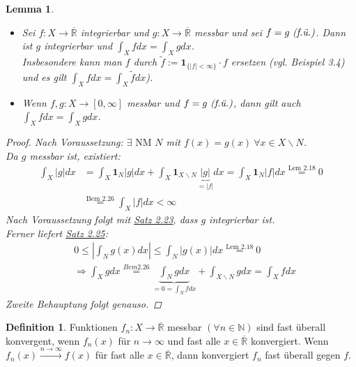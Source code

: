 \documentclass[a4paper]{report}
\newcommand{\doubleOne}{\textbf{1}}
\newcommand{\R}{\mathbb{R}}
\newcommand{\Rq}{\overline{\R}}
\newcommand{\N}{\mathbb{N}}
\newcommand{\jlabel}[1]{\label{j_#1}}
\newcommand{\jshortlink}[1]{\jhyperref{#1}{\text{#1}}}
\newcommand{\jhyperref}[2]{\hyperref[j_#1]{#2}}
\newcommand{\jlink}[1]{\jhyperref{#1}{#1}}
\newcommand{\fu}{\text{\textit{(f.ü.)}}}
\newcommand{\jabb}[3]{ #1: #2 \rightarrow #3 }
\theoremstyle{plain}
\newtheorem{lem}[thm]{Lemma}
\theoremstyle{definition}
\newtheorem{defn}[thm]{Definition}
\begin{document}
{{{{\jlabel{Lem 3.5}
\begin{lem}
    \begin{itemize}
        \item 
            Sei $\jabb{f}{X}{\Rq}$ integrierbar und $\jabb{g}{X}{\Rq}$ messbar und sei $f=g \ \fu$. Dann ist $g$ integrierbar und $\int_X f dx = \int_X g dx$.\\
            Insbesondere kann man $f$ durch $\tilde{f} := \doubleOne_{\{|f| < \infty\}} \cdot f$ ersetzen (vgl. Beispiel 3.4) und es gilt $\int_X f dx = \int_X \tilde{f} dx$).
        \item 
            Wenn $\jabb{f,g}{X}{[0,\infty]}$ messbar und $f=g \ \fu$, dann gilt auch $\int_X f dx = \int_X g dx$.
    \end{itemize}
    \begin{proof}
        Nach Voraussetzung: $\exists \text{ NM } N$ mit $f(x) = g(x) \ \forall x\in X\backslash N$.\\
        Da $g$ messbar ist, existiert:
        \begin{displaymath}
            \begin{split}
                \int_X|g|dx &= \int_X \doubleOne_N |g| dx + \int_X \doubleOne_{X\backslash N} \underbrace{|g|}_{= |f|} dx = \int_X \doubleOne_N|f|dx \overset{\jshortlink{Lem 2.18}}{=} 0\\
                &\overset{\jshortlink{Bem 2.26}}{=} \int_X|f|dx < \infty
            \end{split}
        \end{displaymath}
        Nach Voraussetzung folgt mit \jlink{Satz 2.23}, dass $g$ integrierbar ist.\\
        Ferner liefert \jlink{Satz 2.25}:
        \begin{displaymath}
            \begin{split}
                &0 \le \left|\int_N g(x) dx\right| \le \int_N |g(x)| dx \overset{\jshortlink{Lem 2.18}}{=} 0\\
                &\Rightarrow \int_X g dx \overset{Bem 2.26}{=} \underbrace{\int_N g dx}_{ = 0= \int_N f dx} + \int_{X\backslash N} g dx = \int_X f dx
            \end{split}
        \end{displaymath}
        Zweite Behauptung folgt genauso.
    \end{proof}
\end{lem}

\begin{defn}
\jlabel{Def 3.6}
    Funktionen $\jabb{f_n}{X}{\Rq}$ messbar $(\forall n\in\N)$ sind fast überall konvergent, wenn $f_n(x)$ für $n\rightarrow \infty$ und fast alle $x\in \Rq$ konvergiert. Wenn $f_n(x) \xrightarrow{n\rightarrow \infty} f(x)$ für fast alle $x\in\Rq$, dann konvergiert $f_n$ fast überall gegen $f$.
\end{defn}

}}}}
\end{document}
